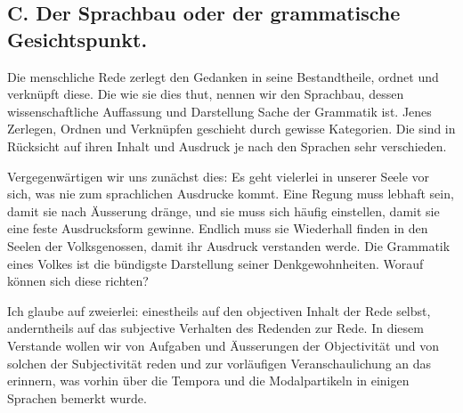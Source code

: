 \label{fp.417}

\clearpage
{}
\subsection*{C. Der Sprachbau oder der grammatische Gesichtspunkt.}\label{IV.IV.18C}

Die menschliche Rede zerlegt den Gedanken in seine Bestandtheile, ordnet und verknüpft diese. Die  wie sie dies thut, nennen wir den Sprachbau, dessen wissenschaftliche Auffassung und Darstellung Sache der Grammatik ist. Jenes Zerlegen, Ordnen und Verknüpfen geschieht durch gewisse Kategorien. Die sind in Rücksicht auf ihren Inhalt und Ausdruck je nach den Sprachen sehr verschieden.

Vergegenwärtigen wir uns zunächst dies: Es geht vielerlei in unserer Seele vor sich, was nie zum sprachlichen Ausdrucke kommt. Eine Regung muss lebhaft sein, damit sie nach Äusserung dränge, und sie muss sich häufig einstellen, damit sie eine feste Ausdrucksform gewinne. Endlich muss sie Wiederhall \label{sp.438} finden in den Seelen der Volksgenossen, damit ihr Ausdruck verstanden werde. Die Grammatik eines Volkes ist die bündigste Darstellung seiner Denkgewohnheiten. Worauf können sich diese richten?

Ich glaube auf zweierlei: einestheils auf den objectiven Inhalt der Rede selbst, anderntheils auf das subjective Verhalten des Redenden zur Rede. In diesem Verstande wollen wir von Aufgaben und Äusserungen der Objectivität und von solchen der Subjectivität reden und zur vorläufigen Veranschaulichung an das erinnern, was vorhin über die Tempora und die Modalpartikeln in einigen Sprachen bemerkt wurde.

